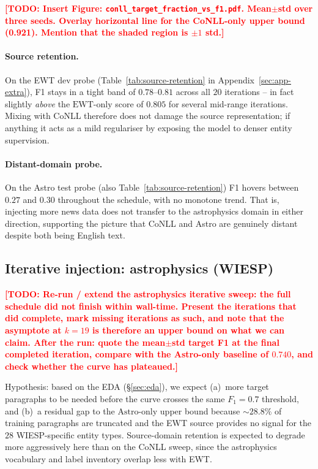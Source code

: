 \documentclass[11pt]{article}
\newcommand{\todo}[1]{\textcolor{red}{\textbf{[TODO: #1]}}}
\begin{document}
\todo{Insert Figure: \texttt{conll\_target\_fraction\_vs\_f1.pdf}.
Mean$\pm$std over three seeds. Overlay horizontal line for the CoNLL-only
upper bound (0.921). Mention that the shaded region is $\pm 1$ std.}

\paragraph{Source retention.}
On the EWT dev probe (Table~\ref{tab:source-retention} in
Appendix~\ref{sec:app-extra}), F1 stays in a tight band of $0.78$--$0.81$
across all $20$ iterations -- in fact slightly \emph{above} the
$\text{EWT-only}$ score of $0.805$ for several mid-range iterations. Mixing
with CoNLL therefore does not damage the source representation; if anything
it acts as a mild regulariser by exposing the model to denser entity supervision.

\paragraph{Distant-domain probe.}
On the Astro test probe (also Table~\ref{tab:source-retention}) F1 hovers
between $0.27$ and $0.30$ throughout the schedule, with no monotone trend.
That is, injecting more news data does not transfer to the astrophysics
domain in either direction, supporting the picture that CoNLL and Astro are
genuinely distant despite both being English text.

\subsection{Iterative injection: astrophysics (WIESP)}
\label{sec:res-astro}

\todo{Re-run / extend the astrophysics iterative sweep:
the full schedule did not finish within wall-time. Present the iterations
that did complete, mark missing iterations as such, and note that the
asymptote at $k{=}19$ is therefore an upper bound on what we can claim.
After the run: quote the mean$\pm$std target F1 at the final completed
iteration, compare with the Astro-only baseline of $0.740$, and check whether
the curve has plateaued.}

Hypothesis: based on the EDA (\S\ref{sec:eda}), we expect (a)~more target
paragraphs to be needed before the curve crosses the same $F_1{=}0.7$
threshold, and (b)~a residual gap to the $\text{Astro-only}$ upper bound
because $\sim$$28.8\%$ of training paragraphs are truncated and the
EWT source provides no signal for the $28$ WIESP-specific entity types.
Source-domain retention is expected to degrade more aggressively here than
on the CoNLL sweep, since the astrophysics vocabulary and label inventory
overlap less with EWT.
\end{document}
